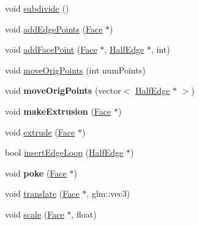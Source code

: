 \begin{DoxyCompactItemize}
\item 
void \hyperlink{class_mesh_a56d19ef4c8338b4dad6958b511077d0a}{subdivide} ()
\item 
void \hyperlink{class_mesh_a5d5f113739ab8219b17076d9c1ead868}{add\-Edge\-Points} (\hyperlink{class_face}{Face} $\ast$)
\item 
void \hyperlink{class_mesh_a86225a4963264c09814ed3009a8daab9}{add\-Face\-Point} (\hyperlink{class_face}{Face} $\ast$, \hyperlink{class_half_edge}{Half\-Edge} $\ast$, int)
\item 
void \hyperlink{class_mesh_a8d42e4555e5006a15893ef7addc2961e}{move\-Orig\-Points} (int num\-Points)
\item 
\hypertarget{class_mesh_ad911d4d8242ca288ddcb6567813378f8}{void {\bfseries move\-Orig\-Points} (vector$<$ \hyperlink{class_half_edge}{Half\-Edge} $\ast$ $>$)}\label{class_mesh_ad911d4d8242ca288ddcb6567813378f8}

\item 
\hypertarget{class_mesh_a792ddf4b0f8f0f287110ba2b7b5286b3}{void {\bfseries make\-Extrusion} (\hyperlink{class_face}{Face} $\ast$)}\label{class_mesh_a792ddf4b0f8f0f287110ba2b7b5286b3}

\item 
void \hyperlink{class_mesh_a558cdb52944d5870355a3c9ffb05efc1}{extrude} (\hyperlink{class_face}{Face} $\ast$)
\item 
bool \hyperlink{class_mesh_a7de72f851dd5b657b9abace304bdd0d5}{insert\-Edge\-Loop} (\hyperlink{class_half_edge}{Half\-Edge} $\ast$)
\item 
\hypertarget{class_mesh_a40dfed0ce0628c66e7d914c8524605c7}{void {\bfseries poke} (\hyperlink{class_face}{Face} $\ast$)}\label{class_mesh_a40dfed0ce0628c66e7d914c8524605c7}

\item 
void \hyperlink{class_mesh_afc1b75d1d066e2364603167d113a3fe9}{translate} (\hyperlink{class_face}{Face} $\ast$, glm\-::vec3)
\item 
void \hyperlink{class_mesh_a59e2936a8989e2d80f7446a866ce363b}{scale} (\hyperlink{class_face}{Face} $\ast$, float)
\end{DoxyCompactItemize}
